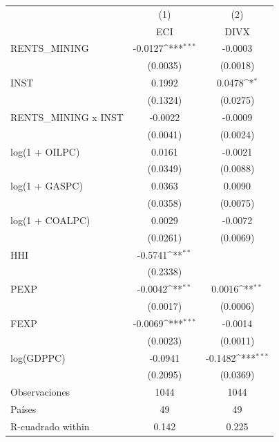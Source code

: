{
\def\sym#1{\ifmmode^{#1}\else\(^{#1}\)\fi}
\begin{tabular}{l*{2}{c}}
\toprule
                    &\multicolumn{1}{c}{(1)}&\multicolumn{1}{c}{(2)}\\
                    &\multicolumn{1}{c}{ECI}&\multicolumn{1}{c}{DIVX}\\
\midrule
RENTS\_MINING        &     -0.0127\sym{***}&     -0.0003         \\
                    &    (0.0035)         &    (0.0018)         \\
\addlinespace
INST                &      0.1992         &      0.0478\sym{*}  \\
                    &    (0.1324)         &    (0.0275)         \\
\addlinespace
RENTS\_MINING x INST &     -0.0022         &     -0.0009         \\
                    &    (0.0041)         &    (0.0024)         \\
\addlinespace
log(1 + OILPC)      &      0.0161         &     -0.0021         \\
                    &    (0.0349)         &    (0.0088)         \\
\addlinespace
log(1 + GASPC)      &      0.0363         &      0.0090         \\
                    &    (0.0358)         &    (0.0075)         \\
\addlinespace
log(1 + COALPC)     &      0.0029         &     -0.0072         \\
                    &    (0.0261)         &    (0.0069)         \\
\addlinespace
HHI                 &     -0.5741\sym{**} &                     \\
                    &    (0.2338)         &                     \\
\addlinespace
PEXP                &     -0.0042\sym{**} &      0.0016\sym{**} \\
                    &    (0.0017)         &    (0.0006)         \\
\addlinespace
FEXP                &     -0.0069\sym{***}&     -0.0014         \\
                    &    (0.0023)         &    (0.0011)         \\
\addlinespace
log(GDPPC)          &     -0.0941         &     -0.1482\sym{***}\\
                    &    (0.2095)         &    (0.0369)         \\
\midrule
Observaciones       &        1044         &        1044         \\
Países              &          49         &          49         \\
R-cuadrado within   &       0.142         &       0.225         \\
\bottomrule
\end{tabular}
}
